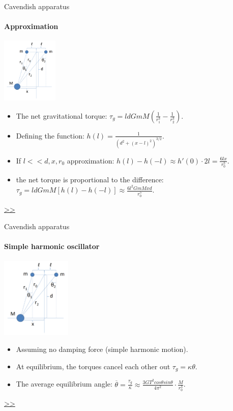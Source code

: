\documentclass{beamer}
\begin{document}
\begin{frame}{Cavendish apparatus}
	\framesubtitle{Approximation}
	\begin{center}		
		\includegraphics[width=0.2\textwidth,keepaspectratio]{Cavendish apparatus.PNG}
    \end{center}
	\begin{itemize}
		\item The net gravitational torque: $\tau_g =  l d GmM(\frac{1}{r_1^3} - \frac{1}{r_2^3})$.
		\item Defining the function: $h(l) = \frac{1}{(d^2 +(x-l)^2)^{3/2}}$.
		\item If $l<<d,x,r_0$ approximation: $h(l)-h(-l)\approx h'(0)\cdot 2l = \frac{6lx}{r_0^5}$.
		\item the net torque is proportional to the difference: $\tau_g = l d GmM[h(l)-h(-l)]\approx \frac{6l^2GmMxd} {r_0^5}$.
	\end{itemize}
	\hyperlink{frame:Gravimetric sensing}{>>} 
\end{frame}
\begin{frame}{Cavendish apparatus}
	\framesubtitle{Simple harmonic oscillator}
	\begin{center}		
		\includegraphics[width=0.25\textwidth,keepaspectratio]{Cavendish apparatus.PNG}
    \end{center}
	\begin{itemize}
		\item Assuming no damping force (simple harmonic motion).
		\item At equilibrium, the torques cancel each other out $\tau_g =  \kappa\theta$.
		\item The average equilibrium angle: $\overline{\theta} = \frac{\tau_g}{\kappa} \approx \frac{3GT^2cos\theta sin\theta}{4\pi^2 } \cdot \frac{M}{r_0^3}$.
		
	\end{itemize}
	\hyperlink{frame:Gravimetric sensing}{>>} 

\end{frame}
\end{document}
